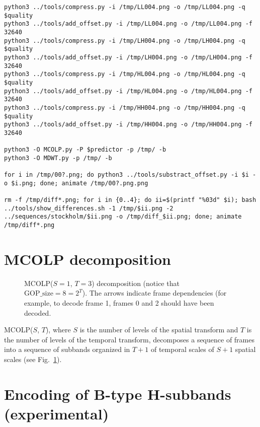\begin{verbatim}
python3 ../tools/compress.py -i /tmp/LL004.png -o /tmp/LL004.png -q $quality
python3 ../tools/add_offset.py -i /tmp/LL004.png -o /tmp/LL004.png -f 32640
python3 ../tools/compress.py -i /tmp/LH004.png -o /tmp/LH004.png -q $quality
python3 ../tools/add_offset.py -i /tmp/LH004.png -o /tmp/LH004.png -f 32640
python3 ../tools/compress.py -i /tmp/HL004.png -o /tmp/HL004.png -q $quality
python3 ../tools/add_offset.py -i /tmp/HL004.png -o /tmp/HL004.png -f 32640
python3 ../tools/compress.py -i /tmp/HH004.png -o /tmp/HH004.png -q $quality
python3 ../tools/add_offset.py -i /tmp/HH004.png -o /tmp/HH004.png -f 32640

python3 -O MCOLP.py -P $predictor -p /tmp/ -b
python3 -O MDWT.py -p /tmp/ -b

for i in /tmp/00?.png; do python3 ../tools/substract_offset.py -i $i -o $i.png; done; animate /tmp/00?.png.png

rm -f /tmp/diff*.png; for i in {0..4}; do ii=$(printf "%03d" $i); bash ../tools/show_differences.sh -1 /tmp/$ii.png -2 ../sequences/stockholm/$ii.png -o /tmp/diff_$ii.png; done; animate /tmp/diff*.png
\end{verbatim}


\section{MCOLP decomposition}

\begin{figure}
  \centering %
  \caption{MCOLP($S=1$, $T=3$) decomposition (notice that
    $\text{GOP\_size}=8=2^T$). The arrows indicate frame dependencies
    (for example, to decode frame 1, frames 0 and 2 should have been
    decoded.} %
  \label{fig:MCOLP_decomposition}
\end{figure}

MCOLP($S$, $T$), where $S$ is the number of levels of the spatial
transform and $T$ is the number of levels of the temporal transform,
decomposes a sequence of frames into a sequence of subbands organized
in $T+1$ of temporal scales of $S+1$ spatial scales (see
Fig.~\ref{fig:MCOLP_decomposition}).


\section{Encoding of B-type H-subbands (experimental)}

